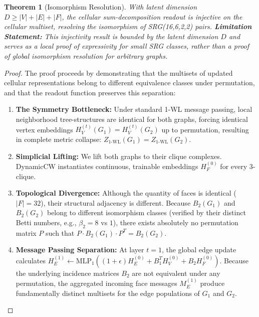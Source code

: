 \documentclass[11pt, letterpaper]{article}
\newtheorem{theorem}{Theorem}[section]
\begin{document}
\begin{theorem}[Isomorphism Resolution]
With latent dimension $D \ge |V|+|E|+|F|$, the cellular sum-decomposition readout is injective on the cellular multiset, resolving the isomorphism of SRG(16,6,2,2) pairs. \textbf{Limitation Statement:} This injectivity result is bounded by the latent dimension $D$ and serves as a local proof of expressivity for small SRG classes, rather than a proof of global isomorphism resolution for arbitrary graphs.
\end{theorem}
\begin{proof}
The proof proceeds by demonstrating that the multisets of updated cellular representations belong to different equivalence classes under permutation, and that the readout function preserves this separation:
\begin{enumerate}
    \item \textbf{The Symmetry Bottleneck:} Under standard 1-WL message passing, local neighborhood tree-structures are identical for both graphs, forcing identical vertex embeddings $H_V^{(t)}(G_1) = H_V^{(t)}(G_2)$ up to permutation, resulting in complete metric collapse: $Z_{1\text{-WL}}(G_1) = Z_{1\text{-WL}}(G_2)$.
    \item \textbf{Simplicial Lifting:} We lift both graphs to their clique complexes. DynamicCW instantiates continuous, trainable embeddings $H_F^{(0)}$ for every 3-clique. 
    \item \textbf{Topological Divergence:} Although the quantity of faces is identical ($|F|=32$), their structural adjacency is different. Because $B_2(G_1)$ and $B_2(G_2)$ belong to different isomorphism classes (verified by their distinct Betti numbers, e.g., $\beta_2 = 8$ vs $1$), there exists absolutely no permutation matrix $P$ such that $P \cdot B_2(G_1) \cdot P^T = B_2(G_2)$.
    \item \textbf{Message Passing Separation:} At layer $t=1$, the global edge update calculates $H_E^{(1)} \leftarrow \text{MLP}_1((1+\epsilon)H_E^{(0)} + B_1^TH_V^{(0)} + B_2H_F^{(0)})$. Because the underlying incidence matrices $B_2$ are not equivalent under any permutation, the aggregated incoming face messages $M_E^{(1)}$ produce fundamentally distinct multisets for the edge populations of $G_1$ and $G_2$.

\end{enumerate}
\end{proof}
\end{document}
